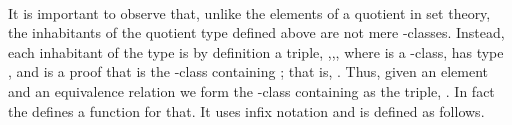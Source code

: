 \documentclass[a4paper,USenglish,cleveref,autoref,thm-restate]{lipics-v2019}
\begin{document}
\begin{code}
\>[0]\AgdaOperator{\AgdaFunction{\AgdaUnderscore{}//\AgdaUnderscore{}}}\AgdaSpace{}%
\AgdaSymbol{:}%
\>[8]\AgdaSymbol{(}\AgdaSpace{}%
\AgdaSymbol{:}\AgdaSpace{}%
\AgdaSpace{}%
\AgdaSpace{}%
\AgdaSymbol{)}\AgdaSpace{}%
\AgdaSpace{}%
\AgdaSpace{}%
\AgdaSpace{}%
\AgdaSpace{}%
\AgdaSpace{}%
\AgdaSymbol{(}\AgdaSpace{}%
\AgdaSpace{}%
\AgdaSymbol{)}\AgdaSpace{}%
\AgdaSpace{}%
\<%
\\
\>[0]\AgdaSpace{}%
\AgdaOperator{\AgdaFunction{//}}\AgdaSpace{}%
\AgdaBound{\Aapprox }\AgdaSpace{}%
\AgdaSymbol{=}\AgdaSpace{}%
\AgdaSpace{}%
\AgdaSpace{}%
\AgdaSpace{}%
\AgdaSymbol{\AgdaUnderscore{}}\AgdaSpace{}%
\AgdaFunction{,}%
\>[21]\AgdaSpace{}%
\AgdaSpace{}%
\AgdaSpace{}%
\AgdaSpace{}%
\AgdaFunction{,}%
\>[32]\AgdaSpace{}%
\AgdaSpace{}%
\AgdaSymbol{(}\AgdaSpace{}%
\AgdaOperator{\AgdaFunction{[}}\AgdaSpace{}%
\AgdaSpace{}%
\AgdaOperator{\AgdaFunction{]}}\AgdaSpace{}%
\AgdaBound{\Aapprox }\AgdaSpace{}%
\AgdaSymbol{)}\<%
\end{code}
It is important to observe that, unlike the elements of a quotient in set theory, the inhabitants of the quotient type defined above are not mere \AgdaBound{\Aapprox }-classes.  Instead, each inhabitant of the type \AgdaSpace{}\AgdaOperator{\AgdaFunction{//}}\AgdaSpace{}\AgdaBound{\Aapprox } is by definition a triple, \AgdaSymbol{(}\AgdaSpace{}\AgdaSpace{},\AgdaSpace{}\AgdaSpace{},\AgdaSpace{}\AgdaSpace{}\AgdaSymbol{)}, where  is a \AgdaBound{\Aapprox }-class,  has type \AgdaSpace{}, and  is a proof that  is the \AgdaBound{\Aapprox }-class containing ; that is, \AgdaSpace{}%
\AgdaSpace{}%
\AgdaSymbol{(}\AgdaSpace{}%
\AgdaOperator{\AgdaFunction{[}}\AgdaSpace{}%
\AgdaSpace{}%
\AgdaOperator{\AgdaFunction{]}}\AgdaSpace{}%
\AgdaBound{\Aapprox }\AgdaSpace{}%
\AgdaSymbol{)}.
Thus, given an element \AgdaSpace{}\AgdaSymbol{:}\AgdaSpace{} and an equivalence relation \AgdaBound{\Aapprox } we form the \AgdaBound{\Aapprox }-class containing  as the triple, \AgdaSymbol{(}\AgdaSpace{}\AgdaOperator{\AgdaFunction{[}}\AgdaSpace{}\AgdaSpace{}\AgdaOperator{\AgdaFunction{]}}\AgdaSpace{}\AgdaBound{\Aapprox }\AgdaSpace{}\AgdaOperator{\AgdaInductiveConstructor{,}}\AgdaSpace{}\AgdaSpace{}\AgdaOperator{\AgdaInductiveConstructor{,}}\AgdaSpace{}\AgdaSpace{}\AgdaSymbol{)}. In fact the \agdaualib defines a function for that.  It uses infix notation and is defined as follows.
\begin{code}\end{code}
\end{document}
